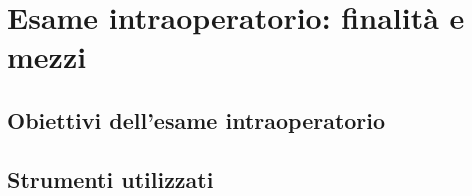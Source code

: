 \chapter{Esame intraoperatorio: finalità e mezzi}

\section{Obiettivi dell’esame intraoperatorio}

\section{Strumenti utilizzati}
